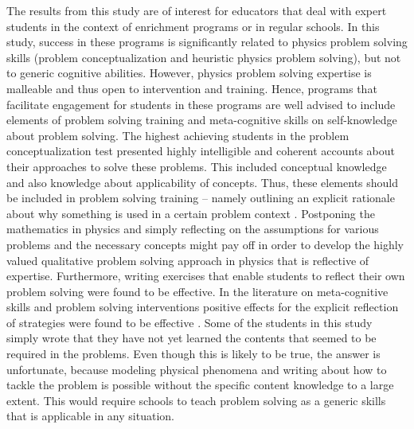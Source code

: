 \documentclass[]{interact}
\begin{document}
The results from this study are of interest for educators that deal with expert students in the context of enrichment programs or in regular schools. In this study, success in these programs is significantly related to physics problem solving skills (problem conceptualization and heuristic physics problem solving), but not to generic cognitive abilities. However, physics problem solving expertise is malleable and thus open to intervention and training. Hence, programs that facilitate engagement for students in these programs are well advised to include elements of problem solving training and meta-cognitive skills on self-knowledge about problem solving. The highest achieving students in the problem conceptualization test presented highly intelligible and coherent accounts about their approaches to solve these problems. This included conceptual knowledge and also knowledge about applicability of concepts. Thus, these elements should be included in problem solving training -- namely outlining an explicit rationale about why something is used in a certain problem context \citep{Fortus.2009}. Postponing the mathematics in physics and simply reflecting on the assumptions for various problems and the necessary concepts might pay off in order to develop the highly valued qualitative problem solving approach in physics that is reflective of expertise. Furthermore, writing exercises that enable students to reflect their own problem solving were found to be effective. In the literature on meta-cognitive skills and problem solving interventions positive effects for the explicit reflection of strategies were found to be effective \citep[e.g.,][]{Bransford.1986,Mason.2010,Perels.2005}. Some of the students in this study simply wrote that they have not yet learned the contents that seemed to be required in the problems. Even though this is likely to be true, the answer is unfortunate, because modeling physical phenomena and writing about how to tackle the problem is possible without the specific content knowledge to a large extent. This would require schools to teach problem solving as a generic skills that is applicable in any situation.
\end{document}
